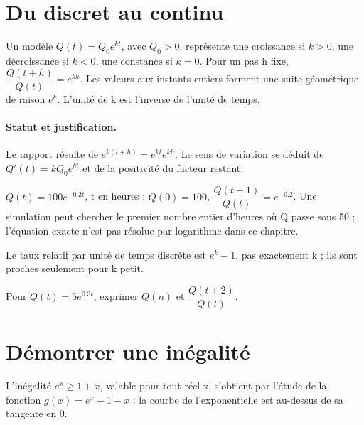 \section{Du discret au continu}\label{C09-U4}
\begin{keypoint}
Un modèle $Q(t)=Q_0e^{kt}$, avec $Q_0>0$, représente une croissance si $k>0$, une décroissance si $k<0$, une constance si $k=0$. Pour un pas h fixe, $\dfrac{Q(t+h)}{Q(t)}=e^{kh}$. Les valeurs aux instants entiers forment une suite géométrique de raison $e^k$. L’unité de k est l’inverse de l’unité de temps.
\end{keypoint}
\paragraph{Statut et justification.} Le rapport résulte de $e^{k(t+h)}=e^{kt}e^{kh}$. Le sens de variation se déduit de $Q\prime(t)=kQ_0e^{kt}$ et de la positivité du facteur restant.
\begin{example}$Q(t)=100e^{-\num{0,2}t}$, t en heures : $Q(0)=100$, $\dfrac{Q(t+1)}{Q(t)}=e^{-\num{0,2}}$. Une simulation peut chercher le premier nombre entier d’heures où Q passe sous 50 ; l’équation exacte n’est pas résolue par logarithme dans ce chapitre.\end{example}\label{C09-EX4}
\begin{pitfall}Le taux relatif par unité de temps discrète est $e^k-1$, pas exactement k ; ils sont proches seulement pour k petit.\end{pitfall}
\begin{application}Pour $Q(t)=5e^{\num{0,3}t}$, exprimer $Q(n)$ et $\dfrac{Q(t+2)}{Q(t)}$.\end{application}\label{C09-AP4}
\section{Démontrer une inégalité}\label{C09-U5}
\begin{keypoint}
L’inégalité $e^x\geq1+x$, valable pour tout réel x, s’obtient par l’étude de la fonction $g(x)=e^x-1-x$ : la courbe de l’exponentielle est au-dessus de sa tangente en 0.
\end{keypoint}
